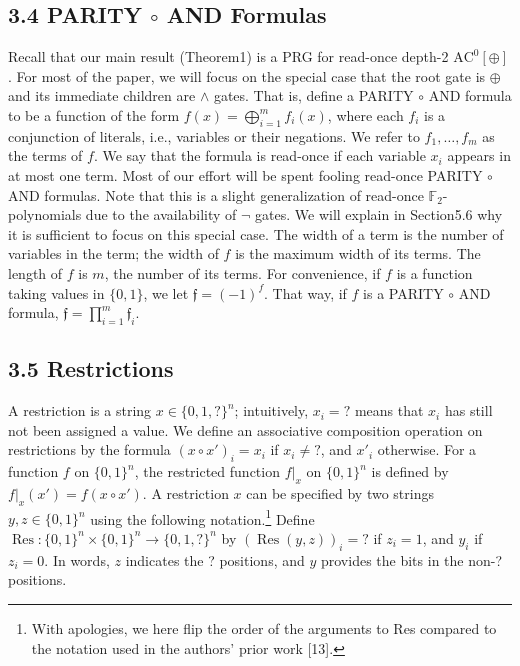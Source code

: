 \documentclass[10pt,a4paper]{article}
\begin{document}
\subsection*{3.4 PARITY $\circ$ AND Formulas}
Recall that our main result (Theorem1) is a PRG for read-once depth-2 $\mathrm{AC}^0[\oplus]$. For most of the paper, we will focus on the special case that the root gate is $\oplus$ and its immediate children are $\wedge$ gates. That is, define a PARITY $\circ$ AND formula to be a function of the form $f(x)=\bigoplus_{i=1}^mf_i(x)$, where each $f_i$ is a conjunction of literals, i.e., variables or their negations. We refer to $f_1,\ldots,f_m$ as the terms of $f$. We say that the formula is read-once if each variable $x_i$ appears in at most one term. Most of our effort will be spent fooling read-once PARITY $\circ$ AND formulas. Note that this is a slight generalization of read-once $\mathbb F_2$-polynomials due to the availability of $\neg$ gates. We will explain in Section5.6 why it is sufficient to focus on this special case.
The width of a term is the number of variables in the term; the width of $f$ is the maximum width of its terms. The length of $f$ is $m$, the number of its terms.
For convenience, if $f$ is a function taking values in $\{0,1\}$, we let $\mathfrak f=(-1)^f$. That way, if $f$ is a PARITY $\circ$ AND formula, $\mathfrak f=\prod_{i=1}^m\mathfrak f_i$.
\subsection*{3.5 Restrictions}
A restriction is a string $x\in\{0,1,?\}^n$; intuitively, $x_i=?$ means that $x_i$ has still not been assigned a value. We define an associative composition operation on restrictions by the formula $(x\circ x')_i=x_i$ if $x_i\ne?$, and $x'_i$ otherwise.
For a function $f$ on $\{0,1\}^n$, the restricted function $f|_x$ on $\{0,1\}^n$ is defined by $f|_x(x')=f(x\circ x')$.
A restriction $x$ can be specified by two strings $y,z\in\{0,1\}^n$ using the following notation.\footnote{With apologies, we here flip the order of the arguments to Res compared to the notation used in the authors' prior work [13].} Define $\operatorname{Res}:\{0,1\}^n\times\{0,1\}^n\to\{0,1,?\}^n$ by $(\operatorname{Res}(y,z))_i=?$ if $z_i=1$, and $y_i$ if $z_i=0$. In words, $z$ indicates the ? positions, and $y$ provides the bits in the non-? positions.
\end{document}

